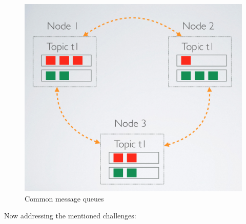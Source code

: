 \begin{figure}[H]
	\centering
	\includegraphics[scale=0.5]{images/de-message-queues.png}
	\caption{Common message queues}
	\label{fig:de-message-queues}
\end{figure}
 Now addressing the mentioned challenges:

